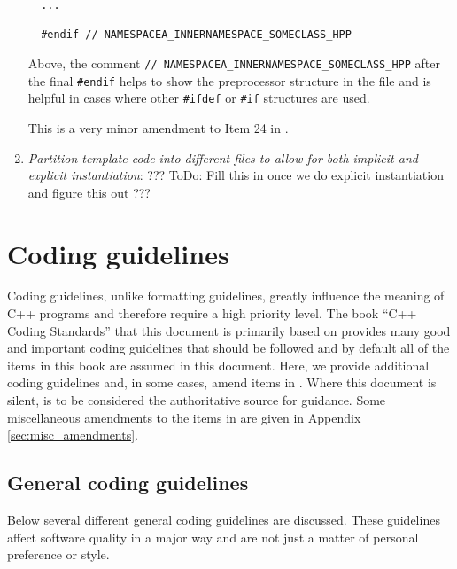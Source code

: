 \begin{enumerate}
{\begin{verbatim}
  ...

  #endif // NAMESPACEA_INNERNAMESPACE_SOMECLASS_HPP
\end{verbatim}}

Above, the comment {}\texttt{//
NAMESPACEA\-\_INNERNAMESPACE\-\_SOMECLASS\-\_HPP} after the final
{}\texttt{\#endif} helps to show the preprocessor structure in the file and is
helpful in cases where other {}\texttt{\#ifdef} or {}\texttt{\#if} structures
are used.

This is a very minor amendment to Item 24 in {}\cite{C++CodingStandards05}.

{}\item\textit{Partition template code into different files to allow for both
implicit and explicit instantiation}: ??? ToDo: Fill this in once we do
explicit instantiation and figure this out ???

\end{enumerate}

%
\section{Coding guidelines}
\label{thyracodingguidelines:codingguidelines:sec}
%

Coding guidelines, unlike formatting guidelines, greatly influence the meaning
of C++ programs and therefore require a high priority level.  The book ``C++
Coding Standards'' {}\cite{C++CodingStandards05} that this document is
primarily based on provides many good and important coding guidelines that
should be followed and by default all of the items in this book are assumed in
this document.  Here, we provide additional coding guidelines and, in some
cases, amend items in {}\cite{C++CodingStandards05}.  Where this document is
silent, {}\cite{C++CodingStandards05} is to be considered the authoritative
source for guidance.  Some miscellaneous amendments to the items in
{}\cite{C++CodingStandards05} are given in Appendix
{}\ref{sec:misc_amendments}.

%
\subsection{General coding guidelines}
%

Below several different general coding guidelines are discussed.  These
guidelines affect software quality in a major way and are not just a matter of
personal preference or style.

